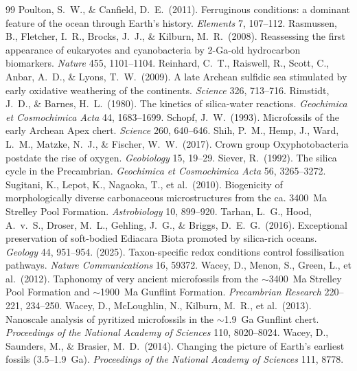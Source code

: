 \documentclass[11pt]{article}
\begin{document}
\begin{thebibliography}{99}
 Poulton, S.~W., \& Canfield, D.~E.\ (2011).
Ferruginous conditions: a dominant feature of the ocean through Earth's history. \textit{Elements} 7,
107--112.
 Rasmussen, B., Fletcher, I.~R., Brocks, J.~J., \&
Kilburn, M.~R.\ (2008). Reassessing the first appearance of eukaryotes and cyanobacteria by
2-Ga-old hydrocarbon biomarkers. \textit{Nature} 455, 1101--1104.
 Reinhard, C.~T., Raiswell, R., Scott, C., Anbar, A.~D.,
\& Lyons, T.~W.\ (2009). A late Archean sulfidic sea stimulated by early oxidative weathering of the
continents. \textit{Science} 326, 713--716.
 Rimstidt, J.~D., \& Barnes, H.~L.\ (1980). The
kinetics of silica-water reactions. \textit{Geochimica et Cosmochimica Acta} 44, 1683--1699.
 Schopf, J.~W.\ (1993). Microfossils of the early Archean Apex
chert. \textit{Science} 260, 640--646.
 Shih, P.~M., Hemp, J., Ward, L.~M., Matzke, N.~J., \& Fischer,
W.~W.\ (2017). Crown group Oxyphotobacteria postdate the rise of oxygen. \textit{Geobiology} 15,
19--29.
 Siever, R.\ (1992). The silica cycle in the Precambrian.
\textit{Geochimica et Cosmochimica Acta} 56, 3265--3272.
 Sugitani, K., Lepot, K., Nagaoka, T., et al.\ (2010).
Biogenicity of morphologically diverse carbonaceous microstructures from the ca. 3400~Ma Strelley
Pool Formation. \textit{Astrobiology} 10, 899--920.
 Tarhan, L.~G., Hood, A.~v.~S., Droser, M.~L., Gehling, J.~G.,
\& Briggs, D.~E.~G.\ (2016). Exceptional preservation of soft-bodied Ediacara Biota promoted by
silica-rich oceans. \textit{Geology} 44, 951--954.
 (2025). Taxon-specific redox conditions control
fossilisation pathways. \textit{Nature Communications} 16, 59372.
 Wacey, D., Menon, S., Green, L., et al.\ (2012). Taphonomy of
very ancient microfossils from the $\sim$3400~Ma Strelley Pool Formation and $\sim$1900~Ma Gunflint
Formation. \textit{Precambrian Research} 220--221, 234--250.
 Wacey, D., McLoughlin, N., Kilburn, M.~R., et al.\ (2013).
Nanoscale analysis of pyritized microfossils in the $\sim$1.9~Ga Gunflint chert. \textit{Proceedings
of the National Academy of Sciences} 110, 8020--8024.
 Wacey, D., Saunders, M., \& Brasier, M.~D.\ (2014).
Changing the picture of Earth's earliest fossils (3.5--1.9~Ga). \textit{Proceedings of the National
Academy of Sciences} 111, 8778.
\end{thebibliography}
\end{document}
